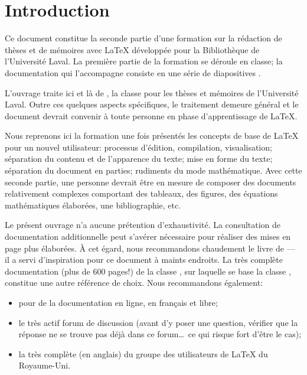 \chapter{Introduction}
\label{chap:introduction}

Ce document constitue la seconde partie d'une formation sur la
rédaction de thèses et de mémoires avec {\LaTeX} développée pour la
Bibliothèque de l'Université Laval. La première partie de
la formation se déroule en classe; la documentation qui
l'accompagne consiste en une série de diapositives
\citep{UL:latex:1}.

L'ouvrage traite ici et là de  \citep{ulthese}, la
classe pour les thèses et mémoires de l'Université Laval. Outre ces
quelques aspects spécifiques, le traitement demeure général et le
document devrait convenir à toute personne en phase d'apprentissage de
{\LaTeX}.

Nous reprenons ici la formation une fois présentés les concepts de
base de {\LaTeX} pour un nouvel utilisateur: processus d'édition,
compilation, visualisation; séparation du contenu et de l'apparence du
texte; mise en forme du texte; séparation du document en parties;
rudiments du mode mathématique. Avec cette seconde partie, une
personne devrait être en mesure de composer des documents relativement
complexes comportant des tableaux, des figures, des équations
mathématiques élaborées, une bibliographie, etc.

Le présent ouvrage n'a aucune prétention d'exhaustivité. La
consultation de documentation additionnelle peut s'avérer nécessaire
pour réaliser des mises en page plus élaborées. À cet égard, nous
recommandons chaudement le livre de \citet{Kopka:latex:4e} --- il a
servi d'inspiration pour ce document à maints endroits. La très
complète documentation (plus de 600 pages!) de la classe
 \citep{memoir}, sur laquelle se base la classe
, constitue une autre référence de choix. Nous
recommandons également:
\begin{itemize}
\item {} pour de la documentation en ligne, en français et
  libre;
\item le très actif forum de discussion
  (avant d'y poser une question, vérifier que la réponse ne se trouve
  pas déjà dans ce forum\dots\ ce qui risque fort d'être le cas);
\item la très complète
   (en anglais) du groupe des
  utilisateurs de {\LaTeX} du Royaume-Uni.
\end{itemize}

